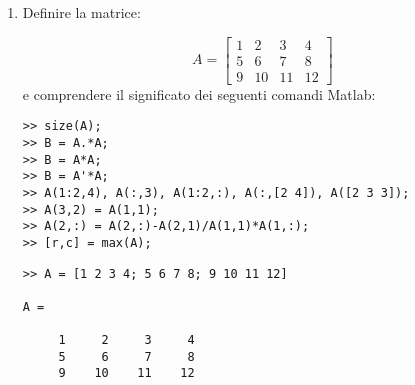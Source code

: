 \begin{enumerate}

\item Definire la matrice:

\[A =\left[
\begin{array}{cccc}
1 & 2 & 3 & 4 \\
5 & 6 & 7 & 8 \\
9 & 10 & 11 & 12
\end{array}\right]
\]
e comprendere il significato dei seguenti comandi Matlab:
\begin{codice}
\begin{verbatim}
>> size(A);
>> B = A.*A;
>> B = A*A;
>> B = A'*A;
>> A(1:2,4), A(:,3), A(1:2,:), A(:,[2 4]), A([2 3 3]);
>> A(3,2) = A(1,1);
>> A(2,:) = A(2,:)-A(2,1)/A(1,1)*A(1,:);
>> [r,c] = max(A);
\end{verbatim}
\end{codice}

\begin{svol}

\begin{codice}
\begin{verbatim}
>> A = [1 2 3 4; 5 6 7 8; 9 10 11 12]

A =

     1     2     3     4
     5     6     7     8
     9    10    11    12


\end{verbatim}
\end{codice}
\end{svol}
\end{enumerate}
